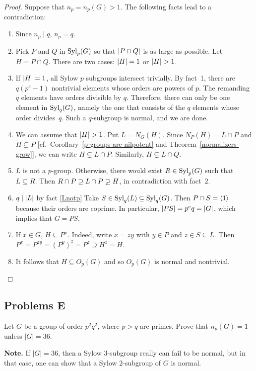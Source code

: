 \begin{proof} Suppose that $n_p=n_p(G)>1$. The following facts lead to a contradiction:
\begin{enumerate}[1.]
    \item Since $n_p\mid q$, $n_p=q$.
    \item Pick $P$ and $Q$ in ${\rm Syl}_p(G)$ so that $\left\vert{P\cap Q}\right\vert$ is as large as possible. Let $H=P\cap Q$. There are two cases: $\left\vert{H}\right\vert=1$ or $\left\vert{H}\right\vert>1$.
    \item If $\left\vert{H}\right\vert=1$, all Sylow $p$ subgroups intersect trivially. By fact~1, there are $q(p^e-1)$ nontrivial elements whose orders are powers of $p$. The remanding $q$ elements have orders divisible by $q$. Therefore, there can only be one element in ${\rm Syl}_q(G)$, namely the one that consists of the $q$ elements whose order divides~$q$. Such a $q$-subgroup is normal, and we are done.
    \item We can assume that $\left\vert{H}\right\vert>1$. Put $L=N_G(H)$. Since $N_P(H)=L\cap P$ and $H\varsubsetneq P$ [cf.~Corollary~\ref{p-groups-are-nilpotent} and Theorem~\ref{normalizers-grow}], we can write $H\varsubsetneq L\cap P$. Similarly, $H\varsubsetneq L\cap Q$.
    \item\label{Lnotp} $L$ is not a $p$-group. Otherwise, there would exist $R\in{\rm Syl}_p(G)$ such that $L\subseteq R$. Then $R\cap P\supseteq L\cap P\varsupsetneq H$, in contradiction with fact~2.
    \item $q\mid\left\vert{L}\right\vert$ by fact \ref*{Lnotp} Take $S\in{\rm Syl}_q(L)\subseteq{\rm Syl}_q(G)$. Then $P\cap S=\langle1\rangle$ because their orders are coprime. In particular, $\left\vert{PS}\right\vert=p^eq=\left\vert{G}\right\vert$, which implies that $G=PS$.
    \item If $x\in G$, $H\subseteq P^x$. Indeed, write $x=zy$ with $y\in P$ and $z\in S\subseteq L$. Then $P^x=P^{zy}=(P^y)^z=P^z\supseteq H^z=H$.
    \item It follows that $H\subseteq O_p(G)$ and so $O_p(G)$ is normal and nontrivial.
\end{enumerate}
 \end{proof}

\subsection{Problems E}

\begin{probl}
    Let\/ $G$ be a group of order $p^2q^2$, where $p > q$ are primes. Prove that $n_p(G) = 1$ unless $|G| = 36$.

    \textrm{\upshape\textbf{Note.} If $|G|=36$, then a Sylow $3$-subgroup really can fail to be normal, but in that case, one can show that a Sylow $2$-subgroup of $G$ is normal.}
\end{probl}

